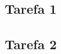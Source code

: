 \documentclass[9pt,conference]{IEEEtran}
\begin{document}
\subsection{Tarefa 1}

%

\subsection{Tarefa 2}
\end{document}
